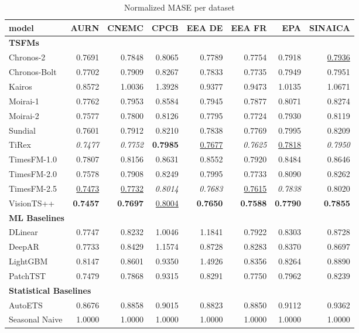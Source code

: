 \begin{table}[H]
\caption{Normalized MASE per dataset}
\centering
\begin{small}
\begin{tabular}{lrrrrrrr}
\toprule
model & AURN & CNEMC & CPCB & EEA DE & EEA FR & EPA & SINAICA \\
\midrule
\multicolumn{8}{l}{\textbf{TSFMs}} \\
Chronos-2 & 0.7691 & 0.7848 & 0.8065 & 0.7789 & 0.7754 & 0.7918 & \underline{0.7936} \\
Chronos-Bolt & 0.7702 & 0.7909 & 0.8267 & 0.7833 & 0.7735 & 0.7949 & 0.7951 \\
Kairos & 0.8572 & 1.0036 & 1.3928 & 0.9377 & 0.9473 & 1.0135 & 1.0671 \\
Moirai-1 & 0.7762 & 0.7953 & 0.8584 & 0.7945 & 0.7877 & 0.8071 & 0.8274 \\
Moirai-2 & 0.7577 & 0.7800 & 0.8126 & 0.7795 & 0.7724 & 0.7930 & 0.8119 \\
Sundial & 0.7601 & 0.7912 & 0.8210 & 0.7838 & 0.7769 & 0.7995 & 0.8209 \\
TiRex & \textit{0.7477} & \textit{0.7752} & \textbf{0.7985} & \underline{0.7677} & \textit{0.7625} & \underline{0.7818} & \textit{0.7950} \\
TimesFM-1.0 & 0.7807 & 0.8156 & 0.8631 & 0.8552 & 0.7920 & 0.8484 & 0.8646 \\
TimesFM-2.0 & 0.7578 & 0.7908 & 0.8249 & 0.7995 & 0.7733 & 0.8090 & 0.8262 \\
TimesFM-2.5 & \underline{0.7473} & \underline{0.7732} & \textit{0.8014} & \textit{0.7683} & \underline{0.7615} & \textit{0.7838} & 0.8020 \\
VisionTS++ & \textbf{0.7457} & \textbf{0.7697} & \underline{0.8004} & \textbf{0.7650} & \textbf{0.7588} & \textbf{0.7790} & \textbf{0.7855} \\
\midrule
\multicolumn{8}{l}{\textbf{ML Baselines}} \\
DLinear & 0.7747 & 0.8232 & 1.0046 & 1.1841 & 0.7922 & 0.8303 & 0.8728 \\
DeepAR & 0.7733 & 0.8429 & 1.1574 & 0.8728 & 0.8283 & 0.8370 & 0.8697 \\
LightGBM & 0.8147 & 0.8601 & 0.9350 & 1.4926 & 0.8356 & 0.8264 & 0.8890 \\
PatchTST & 0.7479 & 0.7868 & 0.9315 & 0.8291 & 0.7750 & 0.7962 & 0.8239 \\
\midrule
\multicolumn{8}{l}{\textbf{Statistical Baselines}} \\
AutoETS & 0.8676 & 0.8858 & 0.9015 & 0.8823 & 0.8850 & 0.9112 & 0.9362 \\
Seasonal Naive & 1.0000 & 1.0000 & 1.0000 & 1.0000 & 1.0000 & 1.0000 & 1.0000 \\
\bottomrule
\end{tabular}
\end{small}
\end{table}